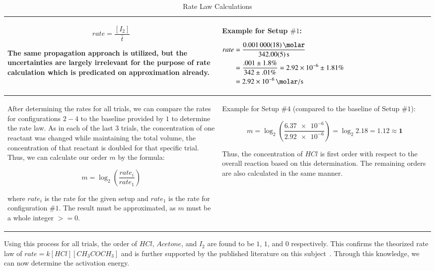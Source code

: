 \begin{table}[h!]
\begin{tabularx}{\textwidth}{|X|X|}
\[rate = \frac{[I_2]}{\bar{t}}\]

The same propagation approach is utilized, but the uncertainties are largely irrelevant for the purpose of rate calculation which is predicated on approximation already.
&
Example for Setup $\# 1$: \newline

	{$\!\begin{aligned}
	rate &= \frac{\SI{.001 \pm .000018}{\molar}}{\SI{342 \pm .05}{\second}} \\
	&= \frac{.001 \pm 1.8\%}{342 \pm .01\%} = \num{2.92e-6} \pm 1.81\% \\
	&= \SI{2.92e-6}{\molar\per\second}
	\end{aligned}$} \\

  \hline
After determining the rates for all trials, we can compare the rates for configurations $2-4$ to the baseline provided by $1$ to determine the rate law. As in each of the last $3$ trials, the concentration of one reactant was changed while maintaining the total volume, the concentration of that reactant is doubled for that specific trial. Thus, we can calculate our order $m$ by the formula:

\[m = \log_2 \left(\frac{rate_i}{rate_1}\right)\]

where $rate_i$ is the rate for the given setup and $rate_1$ is the rate for configuration $\#1$. The result must be approximated, as $m$ must be a whole integer $>=0$.
&
Example for Setup $\# 4$ (compared to the baseline of Setup $\# 1$):

	\[m = \log_2 \left(\frac{\num{6.37e-6}}{\num{2.92e-6}}\right) = \log_2 2.18 = 1.12 \approx \bm{1}\]

Thus, the concentration of $HCl$ is first order with respect to the overall reaction based on this determination. The remaining orders are also calculated in the same manner. \\

\hline

\end{tabularx}
\caption{Rate Law Calculations}
\label{table:rate_law_calculations}
\end{table}

Using this process for all trials, the order of $HCl$, $Acetone$, and $I_2$ are found to be $1$, $1$, and $0$ respectively. This confirms the theorized rate law of $rate = k[HCl][CH_3COCH_3]$ and is further supported by the published literature on this subject~\parencite{main_literature}. Through this knowledge, we can now determine the activation energy.
\newpage

